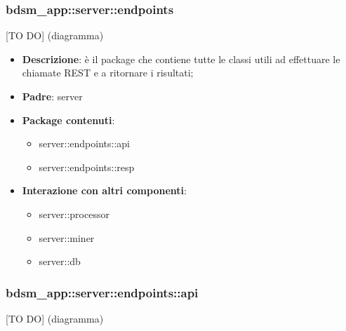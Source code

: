 


\subsubsection{bdsm\_app::server::endpoints} %
\label{ssub:bdsm_app_server_endpoints}
[TO DO] (diagramma) \newline \newline

\begin{itemize}
  \item \textbf{Descrizione}: è il package che contiene tutte le classi utili ad effettuare le chiamate REST e a ritornare i risultati;
  \item \textbf{Padre}: server
  \item \textbf{Package contenuti}:
  	\begin{itemize}
  		\item server::endpoints::api
  		\item server::endpoints::resp
	\end{itemize}
  \item \textbf{Interazione con altri componenti}:
  	\begin{itemize}
  		\item server::processor
  		\item server::miner
  		\item server::db
	\end{itemize}
\end{itemize}

\subsubsection{bdsm\_app::server::endpoints::api} %
\label{ssub:bdsm_app_server_endpoints_api}
[TO DO] (diagramma) \newline \newline

